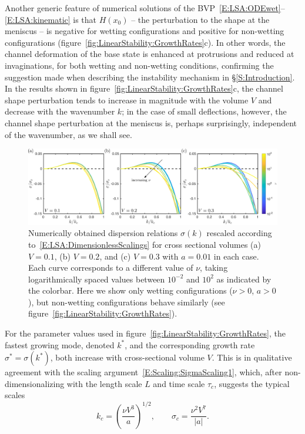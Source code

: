 \documentclass{jfm}
\newcommand{\aspect}{a} %
\begin{document}
Another generic feature of numerical solutions of the BVP~\eqref{E:LSA:ODEwet}--\eqref{E:LSA:kinematic} is that $H(x_0)$ -- the perturbation to the shape at the meniscus -- is negative for wetting configurations and positive for non-wetting configurations (figure~\ref{fig:LinearStability:GrowthRates}c). In other words, the channel deformation of the base state is enhanced at protrusions and reduced at invaginations, for both wetting and non-wetting conditions, confirming the suggestion made when describing the instability mechanism in \S\ref{S:Introduction}. In the results shown in figure~\ref{fig:LinearStability:GrowthRates}c, the channel shape perturbation tends to increase in magnitude with the volume $V$ and decrease with the wavenumber $k$; in the case of small deflections, however, the channel shape perturbation at the meniscus is, perhaps surprisingly, independent of the wavenumber, as we shall see. 

\begin{figure}
\centering
\includegraphics[width = \textwidth]{figures/fig7_rescaled_growth_rates.pdf}
\caption{Numerically obtained dispersion relations $\sigma(k)$ rescaled according to~\eqref{E:LSA:DimensionlessScalings} for cross sectional volumes (a) $V = 0.1$, (b) $V = 0.2$, and (c) $V = 0.3$ with $\aspect = 0.01$ in each case. Each curve corresponds to a different value of $\nu$, taking logarithmically spaced values between $10^{-2}$ and $10^{2}$ as indicated by the colorbar. Here we show only wetting configurations ($\nu >0$, $a >0$), but non-wetting configurations behave similarly (see figure~\ref{fig:LinearStability:GrowthRates}). }
\label{fig:RescaledGrowthRates}
\end{figure}

For the parameter values used in figure~\ref{fig:LinearStability:GrowthRates}, the fastest growing mode, denoted $k^*$, and the corresponding growth rate $\sigma^* = \sigma(k^*)$, both increase with cross-sectional volume $V$. This is in qualitative agreement with the scaling argument~\eqref{E:Scaling:SigmaScaling1}, which, after non-dimensionalizing with the length scale $L$ and time scale $\tau_c$, suggests the typical scales
\begin{equation}\label{E:LSA:DimensionlessScalings}
k_c  = \left(\frac{\nu V^3}{a}\right)^{1/2}, \qquad \sigma_c = \frac{\nu^2 V^7}{|a|}.
\end{equation}
\end{document}
